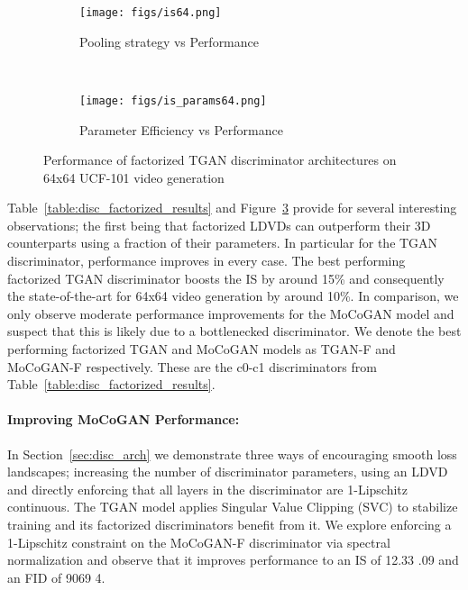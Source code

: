 \documentclass[a4paper,fleqn]{cas-sc}
\begin{document}
\begin{figure}[pos=!h]
    \centering
    \begin{subfigure}[t]{0.5\textwidth}
        \centering
        \texttt{[image: figs/is64.png]}
        \caption{Pooling strategy vs Performance}
        \label{fig:isFconv64arch}
    \end{subfigure}~
    \begin{subfigure}[t]{0.5\textwidth}
        \centering
        \texttt{[image: figs/is\_params64.png]}
        \caption{Parameter Efficiency vs Performance}
        \label{fig:isFconv64par}
    \end{subfigure}
    \caption{Performance of factorized TGAN discriminator architectures on 64x64 UCF-101 video generation}\label{fig:tgan_isFconv64}
\end{figure}


Table~\ref{table:disc_factorized_results} and Figure~\ref{fig:tgan_isFconv64} provide for several interesting observations; the first being that factorized LDVDs can outperform their 3D counterparts using a fraction of their parameters. In particular for the TGAN discriminator, performance improves in every case. The best performing factorized TGAN discriminator boosts the IS by around 15\% and consequently the state-of-the-art for 64x64 video generation by around 10\%. In comparison, we only observe moderate performance improvements for the MoCoGAN model and suspect that this is likely due to a bottlenecked discriminator. We denote the best performing factorized TGAN and MoCoGAN models as TGAN-F and MoCoGAN-F respectively. These are the c0-c1 discriminators from Table~\ref{table:disc_factorized_results}. 


\paragraph{Improving MoCoGAN Performance:} In Section~\ref{sec:disc_arch} we demonstrate three ways of encouraging smooth loss landscapes; increasing the number of discriminator parameters, using an LDVD and directly enforcing that all layers in the discriminator are 1-Lipschitz continuous.  The TGAN model applies Singular Value Clipping (SVC) to stabilize training and its factorized discriminators benefit from it. We explore enforcing a 1-Lipschitz constraint on the MoCoGAN-F discriminator via spectral normalization \cite{MiyatoKKY18spectral} and observe that it improves performance to an IS of 12.33  .09 and an FID of 9069  4. 
\end{document}
